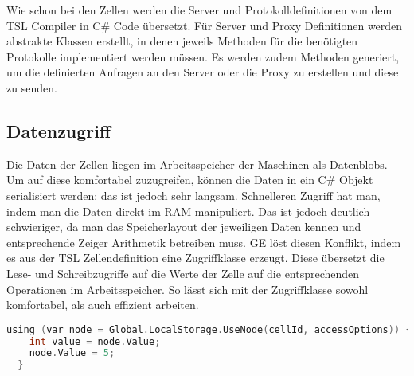 Wie schon bei den Zellen werden die Server und Protokolldefinitionen von dem TSL Compiler in C\# Code übersetzt. Für Server und Proxy
Definitionen werden abstrakte Klassen erstellt, in denen jeweils Methoden für die benötigten Protokolle implementiert werden müssen.
Es werden zudem Methoden generiert, um die definierten Anfragen an den Server oder die Proxy zu erstellen und diese zu senden.


\subsection{Datenzugriff}
\label{geAccessor}

Die Daten der Zellen liegen im Arbeitsspeicher der Maschinen als Datenblobs. Um auf diese komfortabel zuzugreifen, können die Daten in ein C\# Objekt
serialisiert werden; das ist jedoch sehr langsam.
Schnelleren Zugriff hat man, indem man die Daten direkt im RAM manipuliert. Das ist jedoch deutlich schwieriger, da man das Speicherlayout der jeweiligen Daten
kennen und entsprechende Zeiger Arithmetik betreiben muss. GE löst diesen Konflikt, indem es aus der TSL Zellendefinition eine Zugriffklasse erzeugt.
Diese übersetzt die Lese- und Schreibzugriffe auf die Werte der Zelle auf die entsprechenden Operationen im Arbeitsspeicher. So lässt sich mit der Zugriffklasse sowohl
komfortabel, als auch effizient arbeiten.

\begin{lstlisting}[language=c, caption={Bearbeitung einer Zelle mithilfe der Zugriffklasse}]
  using (var node = Global.LocalStorage.UseNode(cellId, accessOptions)) {
    int value = node.Value;
    node.Value = 5;
  }
\end{lstlisting}
